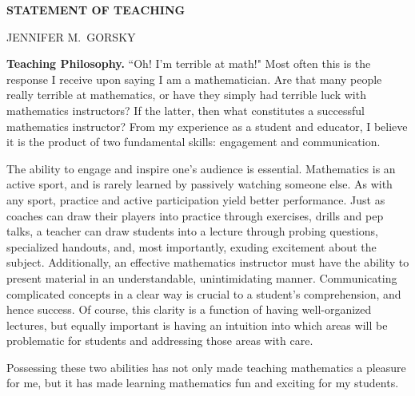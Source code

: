 \documentclass[12pt]{article}
\begin{document}

\newcommand{\bld}{\bf}
\newcommand{\reg}{\normalsize}
\newcommand{\bigbld}{\LARGE\bf}



\centerline{\bf \large STATEMENT OF TEACHING}
\vspace{0.2in}
\centerline{ JENNIFER M.\ GORSKY}
\vspace{0.3in}
\reg






\noindent
{\bf Teaching Philosophy.}  
``Oh!  I'm terrible at math!"  Most often this is the response I receive
upon saying I am a mathematician.  Are that many people
really terrible at mathematics, or have they simply had terrible luck
with mathematics instructors?  If the latter, then what constitutes a
successful mathematics instructor?  From my experience as a student and
educator, I believe it is the product of two fundamental skills: 
engagement and communication.

\quad The ability to engage and inspire one's
audience is essential.  Mathematics is an active sport, and is rarely
learned by passively watching someone else.  As with any sport, practice
and active participation yield better performance.  Just as coaches can
draw their players into practice through exercises, drills and pep talks, a
teacher can draw students into a lecture through probing questions,
specialized handouts, and, most importantly, exuding excitement about the
subject.   Additionally, an effective mathematics instructor must have
the ability to present  material in an understandable, unintimidating
manner.  Communicating complicated concepts in a clear way is crucial to a
student's comprehension, and hence success.  Of course, this clarity is a
function of having well-organized lectures, but equally important is having
an intuition into which areas will be problematic for students and
addressing those areas with care. 
 
\quad Possessing these two abilities has not only made teaching mathematics
a pleasure for me, but it has made learning mathematics fun and exciting
for my students.  



\vspace{0.1in}
\end{document}
